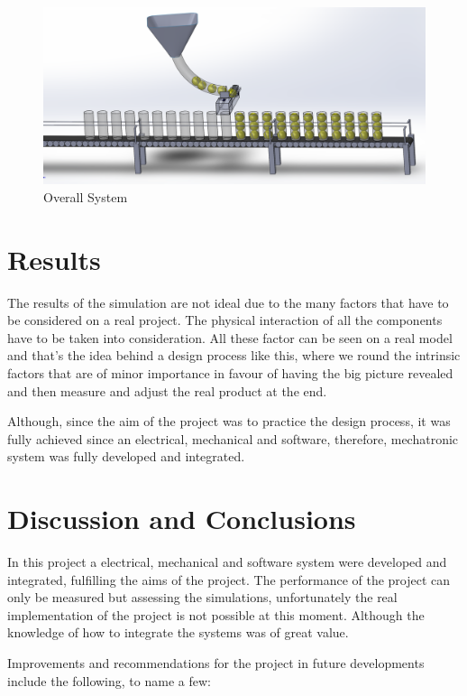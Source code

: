 \documentclass[transmag]{IEEEtran}
\begin{document}
\begin{figure}
\centerline{\includegraphics[width=7in]{./images/Line}}
\caption{Overall System\label{Line}}
\end{figure}



\section{Results}


The results of the simulation are not ideal due to the many factors that have to be considered on a real project. The physical interaction of all the components have to be taken into consideration. All these factor can be seen on a real model and that's the idea behind a design process like this, where we round the intrinsic factors that are of minor importance in favour of having the big picture revealed and then measure and adjust the real product at the end.

Although, since the aim of the project was to practice the design process, it was fully achieved since an electrical, mechanical and software, therefore, mechatronic system was fully developed and integrated.


\section{Discussion and Conclusions}

In this project a electrical, mechanical and software system were developed and integrated, fulfilling the aims of the project. The performance of the project can only be measured but assessing the simulations, unfortunately the real implementation of the project is not possible at this moment. Although the knowledge of how to integrate the systems was of great value.

Improvements and recommendations for the project in future developments include the following, to name a few:
\end{document}
